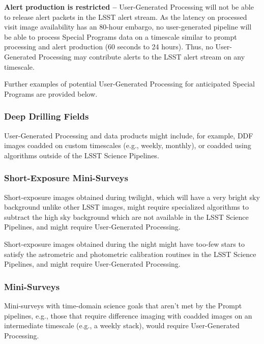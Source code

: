 \textbf{Alert production is restricted -- }
User-Generated Processing will not be able to release alert packets in the LSST alert stream.
As the latency on processed visit image availability has an 80-hour
embargo, no user-generated pipeline will be able to process Special Programs 
data on a timescale similar to prompt processing and alert production 
(60 seconds to 24 hours).
Thus, no User-Generated Processing may contribute alerts to the LSST alert stream on 
any timescale.

Further examples of potential User-Generated Processing for anticipated Special Programs are provided below.

\subsubsection{Deep Drilling Fields}

User-Generated Processing and data products might include, for example, DDF images coadded 
on custom timescales (e.g., weekly, monthly), or coadded using algorithms outside of the 
LSST Science Pipelines.

\subsubsection{Short-Exposure Mini-Surveys}

Short-exposure images obtained during twilight, which will have a very bright sky 
background unlike other LSST images, might require specialized algorithms
to subtract the high sky background which are not available in the LSST Science Pipelines,
and might require User-Generated Processing.

Short-exposure images obtained during the night might have too-few stars to satisfy the
astrometric and photometric calibration routines in the LSST Science Pipelines,
and might require User-Generated Processing.

\subsubsection{Mini-Surveys}

Mini-surveys with time-domain science goals that aren't met by the Prompt pipelines, 
e.g., those that require difference imaging with coadded images on an intermediate 
timescale (e.g., a weekly stack), would require User-Generated Processing.
